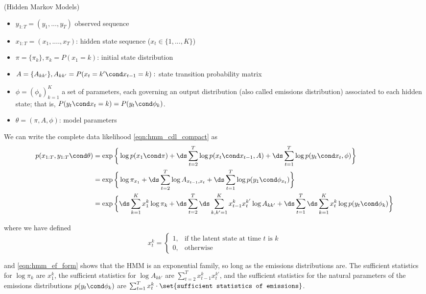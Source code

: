 \documentclass{article} %
\newcommand{\param}{\theta}
\newcommand{\state}{x}
\begin{document}
\begin{example}{(Hidden Markov Models)}
\begin{itemize}
\item $y_{1:T}=(y_1, ..., y_T)$ observed sequence
\item $\state_{1:T} =(\state_1, ...., \state_T)$: hidden state sequence ($\state_t \in \{1,...,K \}$) 
\item $\pi = \{ \pi_k \}, \pi_k = P(\state_1 = k)$: initial state distribution
\item $A=\{A_{kk'}\}, A_{kk'} = P(\state_t= k' \cond \state_{t-1}=k):$ state transition probability matrix 
\item $\phi = (\phi_k)_{k=1}^K$ a set of parameters, each governing an output distribution (also called emissions distribution) associated to each hidden state; that is, $ P(y_t \cond \state_t=k) = P(y_t \cond \phi_k)$. 
\item $\param = (\pi, A, \phi)$: model parameters
\end{itemize}


We can write the complete data likelihood \eqref{eqn:hmm_cdl_compact} as
\begin{align}
p(\state_{1:T}, y_{1:T} \cond \param) &=  \exp\bigg \{ \log p(\state_1 \cond \pi) + \ds\sum_{t=2}^T \log p(\state_t \cond \state_{t-1}, A) +  \ds\sum_{t=1}^T \log p(y_t \cond \state_t, \phi) \bigg\}  \nonumber \\
&= \exp \bigg \{ \log \pi_{\state_1}  + \ds\sum_{t=2}^T \log A_{\state_{t-1}, \state_t} + \ds\sum_{t=1}^T \log p(y_1 \cond \phi_{\state_t}) \bigg\} \nonumber \\
&=  \exp\bigg \{  \ds\sum_{k=1}^K \state_1^k \log \pi_k + \ds\sum_{t=2}^T \ds\sum_{k, k'=1}^K \state_{t-1}^k \state_t^{k'} \log A_{kk'} + \ds\sum_{t=1}^T \ds\sum_{k=1}^K \state_t^k \log p(y_t \cond \phi_k)  \bigg\} \label{eqn:hmm_ef_form}
\end{align}

where we have defined
\[ \state_t^k =  
\begin{cases}	  
1, & \text{if the latent state at time $t$ is $k$} \\
0, & \text{otherwise}
\end{cases} \]

and \eqref{eqn:hmm_ef_form} shows that the HMM is an exponential family, so long as the emissions distributions are. 
The sufficient statistics for $\log \pi_k$ are $\state_1^k$, the sufficient statistics for $\log A_{kk'}$ are $\sum_{t=2}^T \state_{t-1}^k \state_t^{k'}$, and the sufficient statistics for the natural parameters of the emissions distributions $p(y_t \cond \phi_k)$ are  $\sum_{t=1}^T \state_{t}^k \cdot \set{\texttt{sufficient statistics of emissions}}$.

\end{example}
\end{document}
